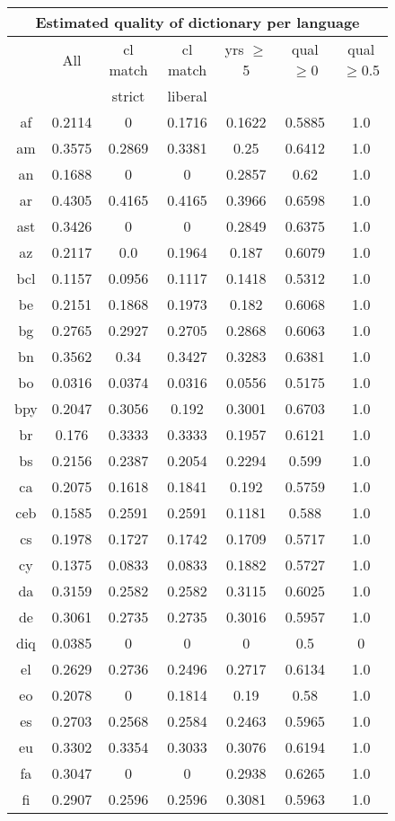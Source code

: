 \begin{figure}[h]
\centering
\begin{tabular}{ccccccc}
\multicolumn{7}{c}{Estimated quality of dictionary per language}\\
\hline\hline
&All&cl match&cl match&yrs $\geq$ 5&qual$\geq$0&qual$\geq$0.5\\
&&strict&liberal&&&\\\hline\hline
af&0.2114&0&0.1716&0.1622&0.5885&1.0\\
am&0.3575&0.2869&0.3381&0.25&0.6412&1.0\\
an&0.1688&0&0&0.2857&0.62&1.0\\
ar&0.4305&0.4165&0.4165&0.3966&0.6598&1.0\\
ast&0.3426&0&0&0.2849&0.6375&1.0\\
az&0.2117&0.0&0.1964&0.187&0.6079&1.0\\
bcl&0.1157&0.0956&0.1117&0.1418&0.5312&1.0\\
be&0.2151&0.1868&0.1973&0.182&0.6068&1.0\\
bg&0.2765&0.2927&0.2705&0.2868&0.6063&1.0\\
bn&0.3562&0.34&0.3427&0.3283&0.6381&1.0\\
bo&0.0316&0.0374&0.0316&0.0556&0.5175&1.0\\
bpy&0.2047&0.3056&0.192&0.3001&0.6703&1.0\\
br&0.176&0.3333&0.3333&0.1957&0.6121&1.0\\
bs&0.2156&0.2387&0.2054&0.2294&0.599&1.0\\
ca&0.2075&0.1618&0.1841&0.192&0.5759&1.0\\
ceb&0.1585&0.2591&0.2591&0.1181&0.588&1.0\\
cs&0.1978&0.1727&0.1742&0.1709&0.5717&1.0\\
cy&0.1375&0.0833&0.0833&0.1882&0.5727&1.0\\
da&0.3159&0.2582&0.2582&0.3115&0.6025&1.0\\
de&0.3061&0.2735&0.2735&0.3016&0.5957&1.0\\
diq&0.0385&0&0&0&0.5&0\\
el&0.2629&0.2736&0.2496&0.2717&0.6134&1.0\\
eo&0.2078&0&0.1814&0.19&0.58&1.0\\
es&0.2703&0.2568&0.2584&0.2463&0.5965&1.0\\
eu&0.3302&0.3354&0.3033&0.3076&0.6194&1.0\\
fa&0.3047&0&0&0.2938&0.6265&1.0\\
fi&0.2907&0.2596&0.2596&0.3081&0.5963&1.0\\

\end{tabular}
\end{figure}
